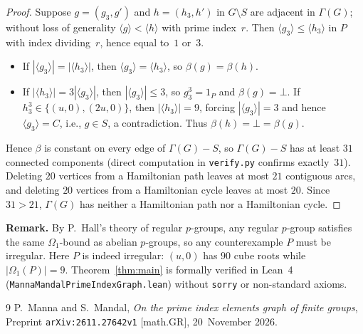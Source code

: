 \documentclass[11pt]{article}
\begin{document}
\begin{proof}
Suppose $g = (g_3, g')$ and $h = (h_3, h')$ in $G \setminus S$ are adjacent in $\Gamma(G)$; without loss of generality $\langle g \rangle < \langle h \rangle$ with prime index~$r$. Then $\langle g_3 \rangle \le \langle h_3 \rangle$ in $P$ with index dividing~$r$, hence equal to~$1$ or~$3$.
\begin{itemize}
  \item If $|\langle g_3 \rangle| = |\langle h_3 \rangle|$, then $\langle g_3 \rangle = \langle h_3 \rangle$, so $\beta(g) = \beta(h)$.
  \item If $|\langle h_3 \rangle| = 3|\langle g_3 \rangle|$, then $|\langle g_3 \rangle| \le 3$, so $g_3^3 = 1_P$ and $\beta(g) = \bot$. If $h_3^3 \in \{(u, 0), (2u, 0)\}$, then $|\langle h_3 \rangle| = 9$, forcing $|\langle g_3 \rangle| = 3$ and hence $\langle g_3 \rangle = C$, i.e., $g \in S$, a contradiction. Thus $\beta(h) = \bot = \beta(g)$.
\end{itemize}
Hence $\beta$ is constant on every edge of $\Gamma(G) - S$, so $\Gamma(G) - S$ has at least $31$ connected components (direct computation in \texttt{verify.py} confirms exactly~$31$). Deleting $20$ vertices from a Hamiltonian path leaves at most $21$ contiguous arcs, and deleting $20$ vertices from a Hamiltonian cycle leaves at most $20$. Since $31 > 21$, $\Gamma(G)$ has neither a Hamiltonian path nor a Hamiltonian cycle.
\end{proof}

\noindent\textbf{Remark.} By P.~Hall's theory of regular $p$-groups, any regular $p$-group satisfies the same $\Omega_1$-bound as abelian $p$-groups, so any counterexample $P$ must be irregular. Here $P$ is indeed irregular: $(u, 0)$ has $90$ cube roots while $|\Omega_1(P)| = 9$. Theorem~\ref{thm:main} is formally verified in Lean~4 (\texttt{MannaMandalPrimeIndexGraph.lean}) without \texttt{sorry} or non-standard axioms.

\begin{thebibliography}{9}
P.~Manna and S.~Mandal,
\emph{On the prime index elements graph of finite groups},
Preprint \texttt{arXiv:2611.27642v1} [math.GR], 20~November 2026.
\end{thebibliography}
\end{document}
